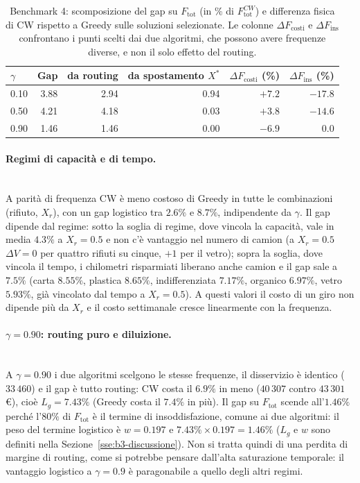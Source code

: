 \begin{table}[htbp]
	\centering
	\caption{Benchmark 4: scomposizione del gap su $F_{\mathrm{tot}}$ (in \% di $F^{CW}_{\mathrm{tot}}$) e differenza fisica di CW rispetto a Greedy sulle soluzioni selezionate. Le colonne $\Delta F_{\mathrm{costi}}$ e $\Delta F_{\mathrm{ins}}$ confrontano i punti scelti dai due algoritmi, che possono avere frequenze diverse, e non il solo effetto del routing.}
	\label{tab:b4_gapdec}
	\small
	\begin{tabular}{lrrrrr}
		\hline
		$\gamma$ & Gap & da routing & da spostamento $X^*$ & $\Delta F_{\mathrm{costi}}$ (\%) & $\Delta F_{\mathrm{ins}}$ (\%) \\
		\hline
		0.10 & 3.88 & 2.94 & 0.94 & $+7.2$ & $-17.8$ \\
		0.50 & 4.21 & 4.18 & 0.03 & $+3.8$ & $-14.6$ \\
		0.90 & 1.46 & 1.46 & 0.00 & $-6.9$ & $0.0$ \\
		\hline
	\end{tabular}
\end{table}

\paragraph{Regimi di capacità e di tempo.}\mbox{}\\
A parità di frequenza CW è meno costoso di Greedy in tutte le combinazioni (rifiuto, $X_r$), con un gap logistico tra $2.6\%$ e $8.7\%$, indipendente da $\gamma$. Il gap dipende dal regime: sotto la soglia di regime, dove vincola la capacità, vale in media $4.3\%$ a $X_r=0.5$ e non c'è vantaggio nel numero di camion (a $X_r=0.5$ $\Delta V=0$ per quattro rifiuti su cinque, $+1$ per il vetro); sopra la soglia, dove vincola il tempo, i chilometri risparmiati liberano anche camion e il gap sale a $7.5\%$ (carta $8.55\%$, plastica $8.65\%$, indifferenziata $7.17\%$, organico $6.97\%$, vetro $5.93\%$, già vincolato dal tempo a $X_r=0.5$). A questi valori il costo di un giro non dipende più da $X_r$ e il costo settimanale cresce linearmente con la frequenza.

\paragraph{$\gamma=0.90$: routing puro e diluizione.}\mbox{}\\
A $\gamma=0.90$ i due algoritmi scelgono le stesse frequenze, il disservizio è identico ($33\,460$) e il gap è tutto routing: CW costa il $6.9\%$ in meno ($40\,307$ contro $43\,301$\,\euro), cioè $L_g=7.43\%$ (Greedy costa il $7.4\%$ in più). Il gap su $F_{\mathrm{tot}}$ scende all'$1.46\%$ perché l'$80\%$ di $F_{\mathrm{tot}}$ è il termine di insoddisfazione, comune ai due algoritmi: il peso del termine logistico è $w=0.197$ e $7.43\%\times0.197=1.46\%$ ($L_g$ e $w$ sono definiti nella Sezione~\ref{sse:b3-discussione}). Non si tratta quindi di una perdita di margine di routing, come si potrebbe pensare dall'alta saturazione temporale: il vantaggio logistico a $\gamma=0.9$ è paragonabile a quello degli altri regimi.

